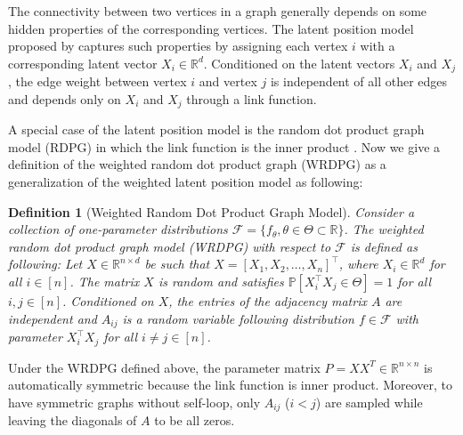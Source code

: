 \documentclass[a4paper]{article}
\newtheorem{definition}[fact]{Definition}
\begin{document}
The connectivity between two vertices in a graph generally depends on some hidden properties of the corresponding vertices. The latent position model proposed by \citet{hoff2002latent} captures such properties by assigning each vertex $i$ with a corresponding latent vector $X_i \in \mathbb{R}^d$. Conditioned on the latent vectors $X_i$ and $X_j$, the edge weight between vertex $i$ and vertex $j$ is independent of all other edges and depends only on $X_i$ and $X_j$ through a link function.

A special case of the latent position model is the random dot product graph model (RDPG) in which the link function is the inner product \citep{young2007random, nickel2007random}. Now we give a definition of the weighted random dot product graph (WRDPG) as a generalization of the weighted latent position model as following:
\begin{definition}[Weighted Random Dot Product Graph Model]
Consider a collection of one-parameter distributions $\mathcal{F} = \{ f_{\theta}, \theta \in \Theta \subset \mathbb{R} \}$. The weighted random dot product graph model (WRDPG) with respect to $\mathcal{F}$ is defined as following: Let $X \in \mathbb{R}^{n \times d}$ be such that $X = [X_1, X_2, \dotsc, X_n]^{\top}$, where $X_i \in \mathbb{R}^d$ for all $i \in [n]$. The matrix $X$ is random and satisfies $\mathbb{P}\left[ X_i^{\top} X_j \in \Theta \right] = 1$ for all $i, j \in [n]$. Conditioned on $X$, the entries of the adjacency matrix $A$ are independent and $A_{ij}$ is a random variable following distribution $f \in \mathcal{F}$ with parameter $ X_i^{\top} X_j $ for all $i \ne j \in [n]$.
\end{definition}
Under the WRDPG defined above, the parameter matrix $P = X X^T \in \mathbb{R}^{n \times n}$ is automatically symmetric because the link function is inner product. Moreover, to have symmetric graphs without self-loop, only $A_{ij}$ ($i < j$) are sampled while leaving the diagonals of $A$ to be all zeros.

\end{document}
